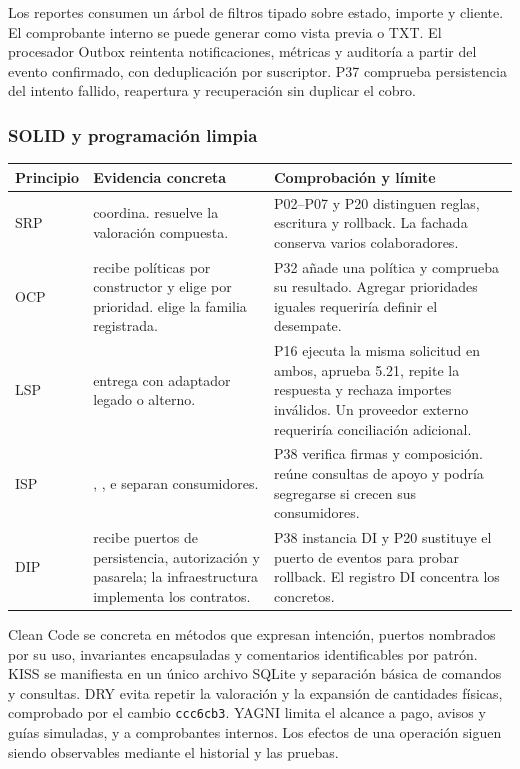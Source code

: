 Los reportes consumen un árbol de filtros tipado sobre estado, importe y cliente. El comprobante interno se puede generar como vista previa o TXT. El procesador Outbox reintenta notificaciones, métricas y auditoría a partir del evento confirmado, con deduplicación por suscriptor. P37 comprueba persistencia del intento fallido, reapertura y recuperación sin duplicar el cobro.

\subsubsection{SOLID y programación limpia}
\begin{longtable}{@{}L{.11\linewidth}L{.48\linewidth}L{.35\linewidth}@{}}
\toprule Principio & Evidencia concreta & Comprobación y límite \\ \midrule\endhead
SRP &  coordina.  resuelve la valoración compuesta. & P02--P07 y P20 distinguen reglas, escritura y rollback. La fachada conserva varios colaboradores. \\
OCP &  recibe políticas por constructor y elige por prioridad.  elige la familia registrada. & P32 añade una política y comprueba su resultado. Agregar prioridades iguales requeriría definir el desempate. \\
LSP &  entrega  con adaptador legado o alterno. & P16 ejecuta la misma solicitud en ambos, aprueba 5.21, repite la respuesta y rechaza importes inválidos. Un proveedor externo requeriría conciliación adicional. \\
ISP & , ,  e  separan consumidores. & P38 verifica firmas y composición.  reúne consultas de apoyo y podría segregarse si crecen sus consumidores. \\
DIP &  recibe puertos de persistencia, autorización y pasarela; la infraestructura implementa los contratos. & P38 instancia DI y P20 sustituye el puerto de eventos para probar rollback. El registro DI concentra los concretos. \\
\bottomrule
\end{longtable}

Clean Code se concreta en métodos que expresan intención, puertos nombrados por su uso, invariantes encapsuladas y comentarios identificables por patrón. KISS se manifiesta en un único archivo SQLite y separación básica de comandos y consultas. DRY evita repetir la valoración y la expansión de cantidades físicas, comprobado por el cambio \texttt{ccc6cb3}. YAGNI limita el alcance a pago, avisos y guías simuladas, y a comprobantes internos. Los efectos de una operación siguen siendo observables mediante el historial y las pruebas.


